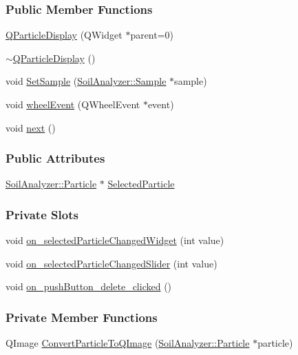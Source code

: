 \subsubsection*{Public Member Functions}
\begin{DoxyCompactItemize}
\item 
\hyperlink{class_q_particle_display_a552bc093c084d6212b6b4ace6f14c3d1}{Q\+Particle\+Display} (Q\+Widget $\ast$parent=0)
\item 
\hyperlink{class_q_particle_display_af942373a3774f1fbe7f8465a263ff473}{$\sim$\+Q\+Particle\+Display} ()
\item 
void \hyperlink{class_q_particle_display_a31d8350736e4d39b9d2391ee8e6edc65}{Set\+Sample} (\hyperlink{class_soil_analyzer_1_1_sample}{Soil\+Analyzer\+::\+Sample} $\ast$sample)
\item 
void \hyperlink{class_q_particle_display_ac73da9c324d8cb6e4d8ce378a0394f50}{wheel\+Event} (Q\+Wheel\+Event $\ast$event)
\item 
void \hyperlink{class_q_particle_display_a9c0978636ba55d8986f60c2630b59e45}{next} ()
\end{DoxyCompactItemize}
\subsubsection*{Public Attributes}
\begin{DoxyCompactItemize}
\item 
\hyperlink{class_soil_analyzer_1_1_particle}{Soil\+Analyzer\+::\+Particle} $\ast$ \hyperlink{class_q_particle_display_ab89d53c5fd63b606de0a3c2e4446d8c1}{Selected\+Particle}
\end{DoxyCompactItemize}
\subsubsection*{Private Slots}
\begin{DoxyCompactItemize}
\item 
void \hyperlink{class_q_particle_display_aa19e1abd163291e87e8b4f2547e90155}{on\+\_\+selected\+Particle\+Changed\+Widget} (int value)
\item 
void \hyperlink{class_q_particle_display_ae532d16adee8293f3ee5fb984b614bdf}{on\+\_\+selected\+Particle\+Changed\+Slider} (int value)
\item 
void \hyperlink{class_q_particle_display_a234e7c98453cad1e0d63c12b7495003a}{on\+\_\+push\+Button\+\_\+delete\+\_\+clicked} ()
\end{DoxyCompactItemize}
\subsubsection*{Private Member Functions}
\begin{DoxyCompactItemize}
\item 
Q\+Image \hyperlink{class_q_particle_display_a185ca2afdcd24fa6107bfd6ff630b5ec}{Convert\+Particle\+To\+Q\+Image} (\hyperlink{class_soil_analyzer_1_1_particle}{Soil\+Analyzer\+::\+Particle} $\ast$particle)
\end{DoxyCompactItemize}
